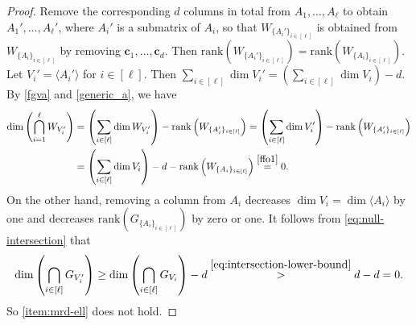 \documentclass[11pt]{article}
\theoremstyle{plain}
\theoremstyle{definition}
\theoremstyle{remark}
\newcommand{\F}{\mathbb{F}}
\newcommand{\rank}{\mathrm{rank}}
\begin{document}
\begin{proof}
Remove the corresponding $d$ columns in total from $A_1,\dots,A_{\ell}$ to obtain $A_1',\dots,A_{\ell}'$, where $A_i'$ is a submatrix of $A_i$, so that $W_{\{A_i'\}_{i\in[\ell]}}$ is obtained from $W_{\{A_i\}_{i\in[\ell]}}$ by removing $\mathbf{c}_1,\dots,\mathbf{c}_d$.
Then $\rank\left(W_{\{A_i'\}_{i\in[\ell]}}\right)=\rank\left(W_{\{A_i\}_{i\in[\ell]}}\right)$. Let $V_i'=\langle A_i' \rangle$ for $i\in [\ell]$. Then $\sum_{i\in [\ell]}\dim V_i'=\left(\sum_{i\in [\ell]}\dim V_i\right)-d$.
By \cref{fgva} and \cref{generic_a}, we have
\begin{align*}
\dim \left(\bigcap_{i=1}^{\ell}W_{V_i'}\right)
&=\left(\sum_{i\in[\ell]}\dim  W_{V_i'}\right)-\rank\left(W_{\{A_i'\}_{i\in[\ell]}}\right)
=\left(\sum_{i\in[\ell]}\dim  V_i'\right)-\rank\left(W_{\{A_i'\}_{i\in[\ell]}}\right)\\
&=\left(\sum_{i\in [\ell]}\dim V_i\right)-d-\rank\left(W_{\{A_i\}_{i\in[\ell]}}\right)\stackrel{\eqref{ffo1}}{=} 0.
\end{align*}
On the other hand, removing a column from $A_i$ decreases $\dim V_i=\dim \langle A_i\rangle$ by one and decreases $\rank\left(G_{\{A_i\}_{i\in[\ell]}}\right)$ by zero or one.
It follows from \eqref{eq:null-intersection} that
\[
\dim\left(\bigcap_{i\in[\ell]}G_{V_i'}\right)
\geq \dim\left(\bigcap_{i\in[\ell]}G_{V_i}\right)-d
\stackrel{\eqref{eq:intersection-lower-bound}}{>} d-d=0.
\]
So \cref{item:mrd-ell} does not hold.
\end{proof}
\end{document}
